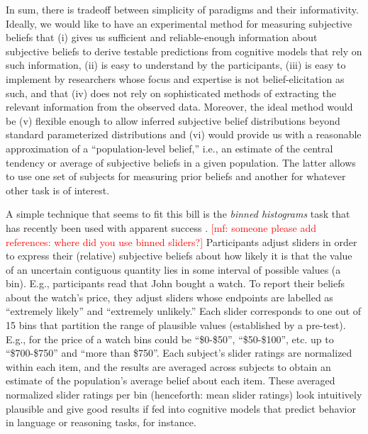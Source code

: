 \documentclass[10pt,letterpaper]{article}
\newcommand{\mf}[1]{\textcolor{Red}{[mf: #1]}}
\newcommand{\citep}[1]{\cite{#1}}
\begin{document}
In sum, there is tradeoff between simplicity of paradigms and their informativity. Ideally, we
would like to have an experimental method for measuring subjective beliefs that (i) gives us
sufficient and reliable-enough information about subjective beliefs to derive testable
predictions from cognitive models that rely on such information, (ii) is easy to understand by
the participants, (iii) is easy to implement by researchers whose focus and expertise is not
belief-elicitation as such, and that (iv) does not rely on sophisticated methods of extracting
the relevant information from the observed data. Moreover, the ideal method would be (v)
flexible enough to allow inferred subjective belief distributions beyond standard parameterized
distributions and (vi) would provide us with a reasonable approximation of a ``population-level
belief,'' i.e., an estimate of the central tendency or average of subjective beliefs in a given
population. The latter allows to use one set of subjects for measuring prior beliefs and
another for whatever other task is of interest.

A simple technique that seems to fit this bill is the \emph{binned histograms} task that has
recently been used with apparent success
\citep{KaoWu2014:Nonliteral-Unde,SchollerFranke2015:Semantic-values}. \mf{someone please add
  references: where did you use binned sliders?} Participants adjust sliders in order to
express their (relative) subjective beliefs about how likely it is that the value of an
uncertain contiguous quantity lies in some interval of possible values (a bin). E.g.,
participants read that John bought a watch.  To report their beliefs about the watch's price,
they adjust sliders whose endpoints are labelled as ``extremely likely'' and ``extremely
unlikely.'' Each slider corresponds to one out of 15 bins that partition the range of plausible
values (established by a pre-test). E.g., for the price of a watch bins could be ``\$0-\$50'',
``\$50-\$100'', etc. up to ``\$700-\$750'' and ``more than \$750''. Each subject's slider
ratings are normalized within each item, and the results are averaged across subjects to obtain
an estimate of the population's average belief about each item. These averaged normalized
slider ratings per bin (henceforth: mean slider ratings) look intuitively plausible and give
good results if fed into cognitive models that predict behavior in language or reasoning tasks,
for instance.
\end{document}
